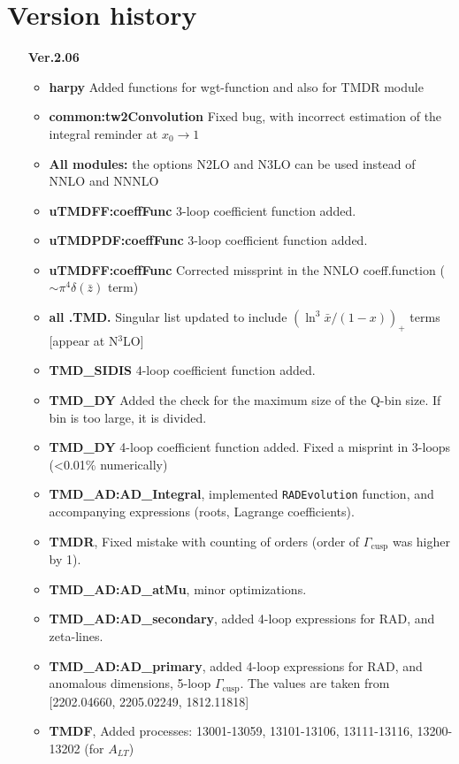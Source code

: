 \documentclass[prd,nofootinbib,eqsecnum,final]{revtex4}
\renewcommand{\(}{\left(}
\renewcommand{\)}{\right)}
\renewcommand{\[}{\left[}
\renewcommand{\]}{\right]}
\begin{document}
\section{Version history}
\begin{itemize}
\item[\textbf{Ver.2.06}]
\begin{itemize}
	\item \textbf{harpy} Added functions for wgt-function and also for TMDR module
	\item \textbf{common:tw2Convolution} Fixed bug, with incorrect estimation of the integral reminder at $x_0\to 1$
	\item \textbf{All modules:} the options N2LO and N3LO can be used instead of NNLO and NNNLO
	\item \textbf{uTMDFF:coeffFunc} 3-loop coefficient function added. 
	\item \textbf{uTMDPDF:coeffFunc} 3-loop coefficient function added.
	\item \textbf{uTMDFF:coeffFunc} Corrected missprint in the NNLO coeff.function ($\sim\pi^4\delta(\bar z)$ term)  
	\item \textbf{all .TMD.} Singular list updated to include $(\ln^3\bar x/(1-x))_+$ terms [appear at N$^3$LO]
	\item \textbf{TMD\_SIDIS} 4-loop coefficient function added. 
	\item \textbf{TMD\_DY} Added the check for the maximum size of the Q-bin size. If bin is too large, it is divided.
	\item \textbf{TMD\_DY} 4-loop coefficient function added. Fixed a misprint in 3-loops (<0.01\% numerically)
	\item \textbf{TMD\_AD:AD\_Integral}, implemented \texttt{RADEvolution} function, and accompanying expressions (roots, Lagrange coefficients).
	\item \textbf{TMDR}, Fixed mistake with counting of orders (order of $\Gamma_{\text{cusp}}$ was higher by 1).
	\item \textbf{TMD\_AD:AD\_atMu}, minor optimizations.
	\item \textbf{TMD\_AD:AD\_secondary}, added 4-loop expressions for RAD, and zeta-lines.
	\item \textbf{TMD\_AD:AD\_primary}, added 4-loop expressions for RAD, and anomalous dimensions, 5-loop $\Gamma_{\text{cusp}}$. The values are taken from [2202.04660, 2205.02249, 1812.11818]
	\item \textbf{TMDF}, Added processes: 13001-13059, 13101-13106, 13111-13116, 13200-13202 (for $A_{LT}$)

\end{itemize}
\end{itemize}
\end{document}
